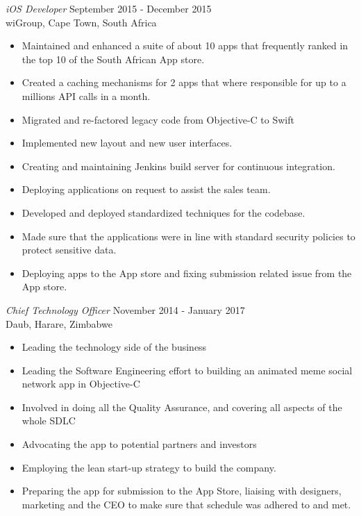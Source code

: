 \documentclass[margin, 10pt]{res} %
\begin{document}
\begin{resume}
\vspace{39 mm}
{\sl iOS Developer} \hfill September 2015 - December 2015 \\
wiGroup, Cape Town, South Africa
\vspace{5mm} %
\begin{itemize} \itemsep -2pt %
\item Maintained and enhanced a suite of about 10 apps that frequently ranked in the top 10 of the South African App store. 
\item Created a caching mechanisms for 2 apps that where responsible for up to a millions API calls in a month.
\item Migrated and re-factored legacy code from Objective-C to Swift
\item Implemented new layout and new user interfaces.
\item Creating and maintaining Jenkins build server for continuous integration.
\item Deploying applications on request to assist the sales team.
\item Developed and deployed standardized techniques for the codebase.
\item Made sure that the applications were in line with standard security policies to protect sensitive data.
\item Deploying apps to the App store and fixing submission related issue from the App store.
\end{itemize}

 {\sl Chief Technology Officer} \hfill November 2014 - January 2017 \\
Daub, Harare, Zimbabwe
\vspace{5mm} %
\begin{itemize} \itemsep -2pt %
\item Leading the technology side of the business
\item Leading the Software Engineering effort to building an animated meme social network app in Objective-C
\item Involved in doing all the Quality Assurance, and covering all aspects of the whole SDLC
\item Advocating the app to potential partners and investors
\item Employing the lean start-up strategy to build the company.
\item Preparing the app for submission to the App Store, liaising with designers, marketing and the CEO to make sure that schedule was adhered to and met.
\end{itemize}
 

\end{resume}
\end{document}
